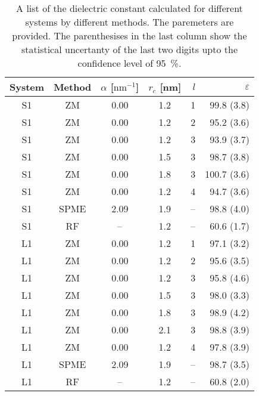 \documentclass[a4paper,reprint,unsortedaddress,onecolumn]{revtex4-1}
\newcommand{\eps}{\varepsilon}
\begin{document}
\begin{table}
  \centering
  \caption{A list of the dielectric constant calculated for different systems by different methods.
    The paremeters are provided. The parenthesises in the last column show the statistical uncertanty
    of the last two digits upto the confidence level of 95~\%.}
  \begin{tabular*}{0.5\textwidth}{@{\extracolsep{\fill}}cccc rr}\hline\hline
    System & Method      &       $\alpha$ [$\textrm{nm}^{-1}$] & $r_c$ [nm] &    $l$     &       $\eps$ \\\hline
    S1  &       ZM          &       0.00    &       1.2     &       1       &       99.8 (3.8)\\ 
    S1  &       ZM          &       0.00    &       1.2     &       2       &       95.2 (3.6)\\ 
    S1  &       ZM          &       0.00    &       1.2     &       3       &       93.9 (3.7)\\ 
    S1  &       ZM          &       0.00    &       1.5     &       3       &       98.7 (3.8)\\ 
    S1  &       ZM          &       0.00    &       1.8     &       3       &      100.7 (3.6)\\ 
    S1  &       ZM          &       0.00    &       1.2     &       4       &       94.7 (3.6)\\
    S1   & SPME          & 2.09  & 1.9   &       --      &       98.8 (4.0) \\
    S1  & RF             & --  & 1.2 & -- & 60.6   (1.7) \\
    L1  &       ZM          &       0.00    &       1.2     &       1       &       97.1 (3.2)\\ 
    L1  &       ZM          &       0.00    &       1.2     &       2       &       95.6 (3.5)\\ 
    L1  &       ZM          &       0.00    &       1.2     &       3       &       95.8 (4.6)\\ 
    L1  &       ZM          &       0.00    &       1.5     &       3       &       98.0 (3.3)\\ 
    L1  &       ZM          &       0.00    &       1.8     &       3       &       98.9 (4.2)\\ 
    L1  &       ZM          &       0.00    &       2.1     &       3       &       98.8 (3.9)\\ 
    L1  &       ZM          &       0.00    &       1.2     &       4       &       97.8 (3.9)\\
   L1   & SPME          & 2.09  & 1.9   &       --      &       98.7 (3.5) \\
    L1  & RF             & --  & 1.2 & -- & 60.8   (2.0) \\
    \hline\hline
  \end{tabular*}
  \label{tab:tmp2}
\end{table}
\end{document}
